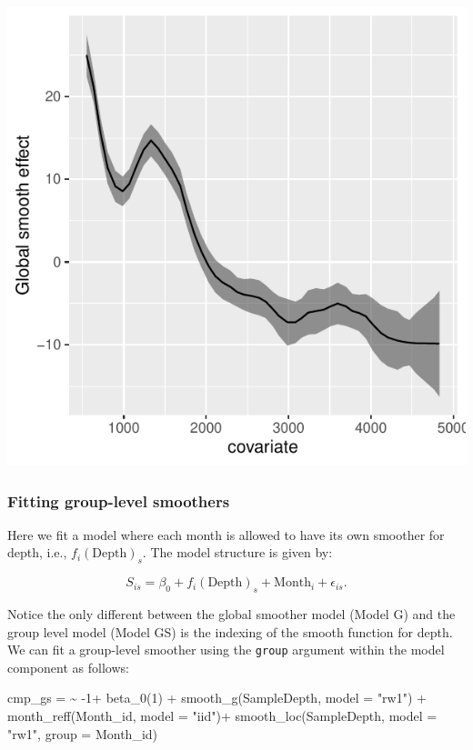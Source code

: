 \documentclass[
  letterpaper,
  DIV=11,
  numbers=noendperiod]{scrartcl}
\newenvironment{Shaded}{\begin{snugshade}}{\end{snugshade}}
\newcommand{\AttributeTok}[1]{\textcolor[rgb]{0.40,0.45,0.13}{#1}}
\newcommand{\DecValTok}[1]{\textcolor[rgb]{0.68,0.00,0.00}{#1}}
\newcommand{\ErrorTok}[1]{\textcolor[rgb]{0.68,0.00,0.00}{#1}}
\newcommand{\FunctionTok}[1]{\textcolor[rgb]{0.28,0.35,0.67}{#1}}
\newcommand{\NormalTok}[1]{\textcolor[rgb]{0.00,0.23,0.31}{#1}}
\newcommand{\OtherTok}[1]{\textcolor[rgb]{0.00,0.23,0.31}{#1}}
\newcommand{\SpecialCharTok}[1]{\textcolor[rgb]{0.37,0.37,0.37}{#1}}
\newcommand{\StringTok}[1]{\textcolor[rgb]{0.13,0.47,0.30}{#1}}
\begin{document}
\begin{tcolorbox}
\begin{center}
\includegraphics{day1_practical_2_files/figure-pdf/unnamed-chunk-42-1.pdf}
\end{center}

\end{tcolorbox}

\subsubsection{Fitting group-level
smoothers}\label{fitting-group-level-smoothers}

Here we fit a model where each month is allowed to have its own smoother
for depth, i.e., \(f_i(\text{Depth})_s\). The model structure is given
by:

\[
S_{is} = \beta_0 + f_i(\text{Depth})_s + \text{Month}_i +  \epsilon_{is}.
\]

Notice the only different between the global smoother model (Model G)
and the group level model (Model GS) is the indexing of the smooth
function for depth. We can fit a group-level smoother using the
\texttt{group} argument within the model component as follows:

\begin{Shaded}
\begin{Highlighting}[]
\NormalTok{cmp\_gs }\OtherTok{=}  \ErrorTok{\textasciitilde{}} \SpecialCharTok{{-}}\DecValTok{1}\SpecialCharTok{+} \FunctionTok{beta\_0}\NormalTok{(}\DecValTok{1}\NormalTok{) }\SpecialCharTok{+}
  \FunctionTok{smooth\_g}\NormalTok{(SampleDepth, }\AttributeTok{model =} \StringTok{"rw1"}\NormalTok{) }\SpecialCharTok{+} 
  \FunctionTok{month\_reff}\NormalTok{(Month\_id, }\AttributeTok{model =} \StringTok{"iid"}\NormalTok{)}\SpecialCharTok{+}
  \FunctionTok{smooth\_loc}\NormalTok{(SampleDepth, }\AttributeTok{model =} \StringTok{"rw1"}\NormalTok{, }\AttributeTok{group =}\NormalTok{ Month\_id)}
\end{Highlighting}
\end{Shaded}
\end{document}
